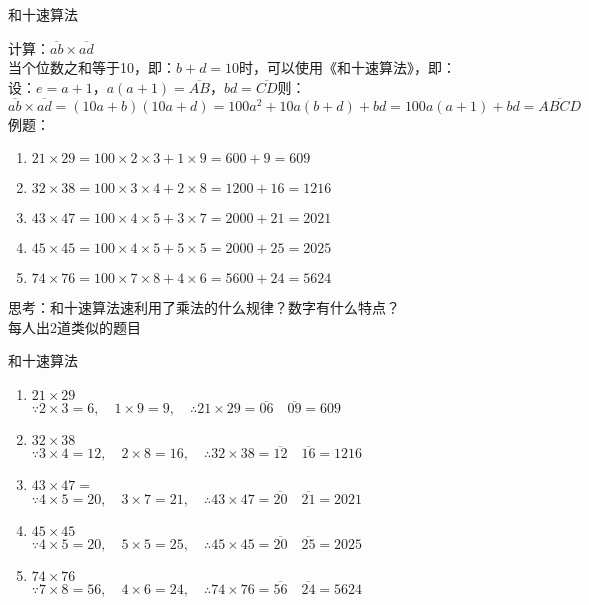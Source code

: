 \documentclass[aspectratio=169]{ctexbeamer} %
\date{\today}
\begin{document}
\begin{frame}[t]{和十速算法}
\begin{spacing}{1.2}
\normalsize
计算：$\overline{ab} \times \overline{ad}$ \\
当个位数之和等于10，即：$b + d = 10$时，可以使用《和十速算法》，即：\\
设：$e = a+1$，$a(a+1)=\overline{AB}$，$bd = \overline {CD}$则：\\
$\overline{ab} \times \overline{ad} = (10a+b)(10a+d) = 100a^2 + 10a(b+d) + bd = 100a(a+1) + bd = \overline{ABCD}$ \\
例题：
\begin{enumerate}[label={\arabic*.}]
\item $21 \times 29 = 100 \times 2 \times 3 + 1 \times 9 = 600 + 9 = 609$
\item $32 \times 38 = 100 \times 3 \times 4 + 2 \times 8 = 1200 + 16 = 1216$
\item $43 \times 47 = 100 \times 4 \times 5 + 3 \times 7 = 2000 + 21 = 2021$
\item $45 \times 45 = 100 \times 4 \times 5 + 5 \times 5 = 2000 + 25 = 2025$
\item $74 \times 76 = 100 \times 7 \times 8 + 4 \times 6 = 5600 + 24 = 5624$
\end{enumerate}
\alert{思考：和十速算法速利用了乘法的什么规律？数字有什么特点？}\\
\alert{每人出2道类似的题目}  \\

\end{spacing}
\end{frame}

\begin{frame}[t]{和十速算法}
\begin{spacing}{1.2}
\normalsize
\begin{enumerate}[label={\arabic*.}]
\item $21 \times 29$ \\
\pause
$ \because 2 \times 3 = 6, \quad 1 \times 9 = 9, \quad \therefore 21 \times 29 = \overline{06} \quad \overline{09} = 609$
\item $32 \times 38$ \\
\pause
$ \because 3 \times 4 = 12, \quad 2 \times 8 = 16, \quad \therefore 32 \times 38 = \overline{12} \quad \overline{16} = 1216$
\item $43 \times 47 = $ \\
\pause
$ \because 4 \times 5 = 20, \quad 3 \times 7 = 21, \quad \therefore 43 \times 47 = \overline{20} \quad \overline{21} = 2021$
\item $45 \times 45$ \\
\pause
$ \because 4 \times 5 = 20, \quad 5 \times 5 = 25, \quad \therefore 45 \times 45 = \overline{20} \quad \overline{25} = 2025$
\item $74 \times 76$ \\
\pause
$ \because 7 \times 8 = 56, \quad 4 \times 6 = 24, \quad \therefore 74 \times 76 = \overline{56} \quad \overline{24} = 5624$
\end{enumerate}


\end{spacing}
\end{frame}
\end{document}
